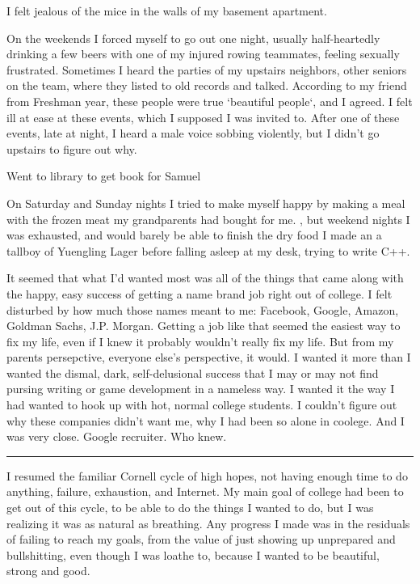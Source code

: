 I felt jealous of the mice in the walls of my basement apartment.

On the weekends I forced myself to go out one night, usually half-heartedly
drinking a few beers with one of my injured rowing teammates, feeling sexually
frustrated.  Sometimes I heard the parties of my upstairs neighbors, other
seniors on the team, where they listed to old records and talked.  According to
my friend from Freshman year, these people were true `beautiful people`, and I
agreed.  I felt ill at ease at these events, which I supposed I was invited to.
After one of these events, late at night, I heard a male voice sobbing
violently, but I didn't go upstairs to figure out why.

Went to library to get book for Samuel

On Saturday and Sunday nights I tried to make myself happy by making a meal with
the frozen meat my grandparents had bought for me.  , but weekend nights I was
exhausted, and would barely be able to finish the dry food I made an a tallboy
of Yuengling Lager before falling asleep at my desk, trying to write C++.

It seemed that what I'd wanted most was all of the things that came along with
the happy, easy success of getting a name brand job right out of college.  I
felt disturbed by how much those names meant to me: Facebook, Google, Amazon,
Goldman Sachs, J.P. Morgan.  Getting a job like that seemed the easiest way to
fix my life, even if I knew it probably wouldn't really fix my life.  But from
my parents persepctive, everyone else's perspective, it would.  I wanted it more
than I wanted the dismal, dark, self-delusional success that I may or may not
find pursing writing or game development in a nameless way.  I wanted it the way
I had wanted to hook up with hot, normal college students.  I couldn't figure
out why these companies didn't want me, why I had been so alone in coolege.  And
I was very close.  Google recruiter.  Who knew.

\plainfancybreak{12pt}{2}{* * *}

I resumed the familiar Cornell cycle of high hopes, not having enough time to do
anything, failure, exhaustion, and Internet.  My main goal of college had been
to get out of this cycle, to be able to do the things I wanted to do, but I was
realizing it was as natural as breathing.  Any progress I made was in the
residuals of failing to reach my goals, from the value of just showing up
unprepared and bullshitting, even though I was loathe to, because I wanted to be
beautiful, strong and good.

